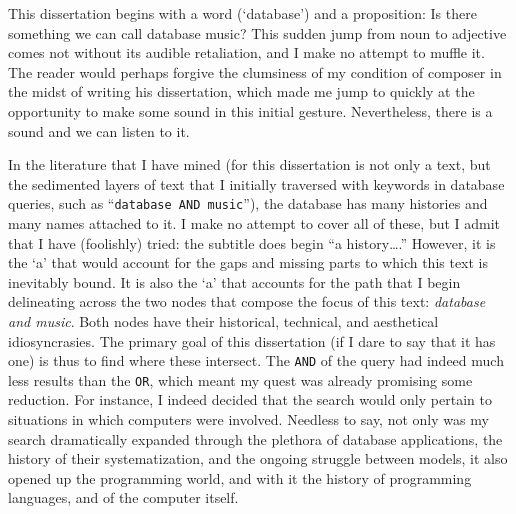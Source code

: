 This dissertation begins with a word (`database') and a proposition: Is there something we can call database music? This sudden jump from noun to adjective comes not without its audible retaliation, and I make no attempt to muffle it. The reader would perhaps forgive the clumsiness of my condition of composer in the midst of writing his dissertation, which made me jump to quickly at the opportunity to make some sound in this initial gesture. Nevertheless, there is a sound and we can listen to it.

In the literature that I have mined (for this dissertation is not only a text, but the sedimented layers of text that I initially traversed with keywords in database queries, such as ``\texttt{database AND music}''), the database has many histories and many names attached to it. I make no attempt to cover all of these, but I admit that I have (foolishly) tried: the subtitle does begin ``a history\dots.'' However, it is the `a' that would account for the gaps and missing parts to which this text is inevitably bound. It is also the `a' that accounts for the path that I begin delineating across the two nodes that compose the focus of this text: \textit{database and music}. Both nodes have their historical, technical, and aesthetical idiosyncrasies. The primary goal of this dissertation (if I dare to say that it has one) is thus to find where these intersect. The \texttt{AND} of the query had indeed much less results than the \texttt{OR}, which meant my quest was already promising some reduction. For instance, I indeed decided that the search would only pertain to situations in which computers were involved. Needless to say, not only was my search dramatically expanded through the plethora of database applications, the history of their systematization, and the ongoing struggle between models, it also opened up the programming world, and with it the history of programming languages, and of the computer itself. 

